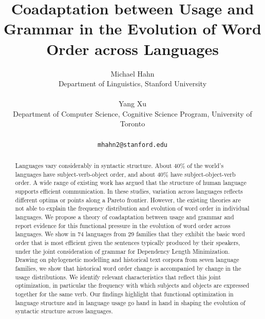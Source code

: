 \documentclass[11pt,a4paper]{article}
\title{Coadaptation between
Usage and Grammar in the Evolution of Word Order across Languages}
\author{Michael Hahn\\Department of Linguistics, Stanford University\\\\Yang Xu\\ Department of Computer Science, Cognitive Science Program, University of Toronto\\\\ \texttt{mhahn2@stanford.edu}}
\date{}
\begin{document}
\maketitle

\linenumbers

\begin{abstract}
Languages vary considerably in syntactic structure.
About 40\% of the world's languages have subject-verb-object order, and about 40\% have subject-object-verb order.
A wide range of existing work has argued that the structure of human language supports efficient communication. In these studies, variation across languages reflects different optima or points along a Pareto frontier. However, the existing theories are not able to explain the  frequency distribution and evolution of word order in individual languages.
We propose a theory of coadaptation between usage and grammar and report evidence for this functional pressure in the evolution of word order across languages. We show in 74 languages from 29 families that they exhibit the basic word order that is most efficient given the sentences typically produced by their speakers, under the joint consideration of grammar for Dependency Length Minimization.
Drawing on phylogenetic modelling and historical text corpora from seven language families, we show that historical word order change is accompanied by change in the usage distributions.
We identify relevant characteristics that reflect this joint optimization, in particular the frequency with which subjects and objects are expressed together for the same verb.
Our findings highlight that functional optimization in language structure and in language usage go hand in hand in shaping the evolution of syntactic structure across languages.
\end{abstract}



\end{document}
